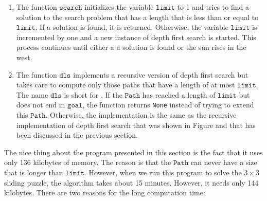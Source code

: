 \begin{enumerate}
\item The function $\texttt{search}$ initializes the variable $\texttt{limit}$ to 1 and tries to find a solution
      to the search problem that has a length that is less than or equal to $\texttt{limit}$.  If a solution is
      found, it is returned.  Otherwise, the variable $\texttt{limit}$ is incremented by one and a
      new instance of depth first search is started.  This process continues until either a 
      a solution is found or the sun rises in the west.
\item The function $\texttt{dls}$ implements a recursive version of depth first search but takes care to compute only
      those paths that have a length of at most $\texttt{limit}$.  The name $\texttt{dls}$ is short for 
      .  If the $\texttt{Path}$ has reached a length
      of $\texttt{limit}$ but does not end in $\texttt{goal}$, the function returns \texttt{None} instead of
      trying to extend this $\texttt{Path}$.  Otherwise, the implementation is the same as the recursive
      implementation of depth first search that was shown in Figure 
      and that has been discussed in the previous section.

\end{enumerate}
The nice thing about the program presented in this section is the fact that it uses only 136 kilobytes of
memory.  The reason is that the $\texttt{Path}$ can never have a size that is longer than $\texttt{limit}$.
However, when we run this program to solve the $3 \times 3$ sliding puzzle, the algorithm takes
about 15 minutes.  However, it needs only 144 kilobytes.  There are two reasons for the long computation time:

